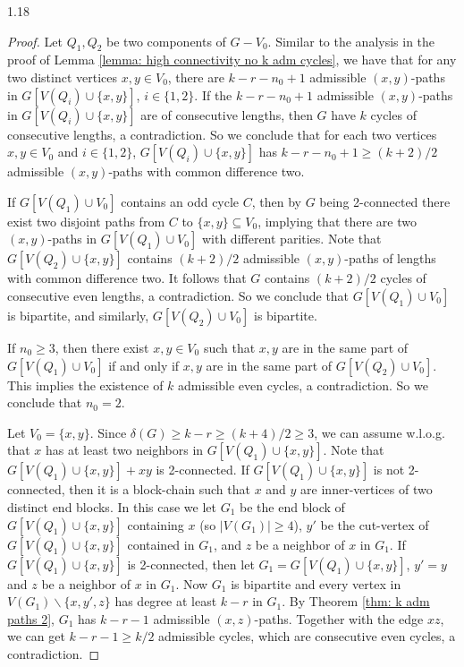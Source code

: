 \documentclass[10pt]{article}
\begin{document}
\begin{spacing}{1.18}
\begin{proof}
    Let $Q_1,Q_2$ be two components of $G-V_0$. Similar to the analysis in the proof of Lemma \ref{lemma: high connectivity no k adm cycles}, we have that for any two distinct vertices $x,y\in V_0$, there are $k-r-n_0+1$ admissible $(x,y)$-paths in $G[V(Q_i)\cup \{x,y\}]$, $i\in \{1,2\}$. If the $k-r-n_0+1$ admissible $(x,y)$-paths in $G[V(Q_i)\cup \{x,y\}]$ are of consecutive lengths, then $G$ have $k$ cycles of consecutive lengths, a contradiction. So we conclude that for each two vertices $x,y\in V_0$ and $i\in\{1,2\}$, $G[V(Q_i)\cup \{x,y\}]$ has $k-r-n_0+1\geqslant (k+2)/2$ admissible $(x,y)$-paths with common difference two. 
    
    If $G[V(Q_1)\cup V_0]$ contains an odd cycle $C$, then by $G$ being 2-connected there exist two disjoint paths from $C$ to $\{x,y\}\subseteq V_0$, implying that there are two $(x,y)$-paths in $G[V(Q_1)\cup V_0]$ with different parities. Note that $G[V(Q_2)\cup \{x,y\}]$ contains $(k+2)/2$ admissible $(x,y)$-paths of lengths with common difference two. It follows that $G$ contains $(k+2)/2$ cycles of consecutive even lengths, a contradiction. So we conclude that $G[V(Q_1)\cup V_0]$ is bipartite, and similarly, $G[V(Q_2)\cup V_0]$ is bipartite. 
    
    If $n_0\geqslant 3$, then there exist $x,y\in V_0$ such that $x,y$ are in the same part of $G[V(Q_1)\cup V_0]$ if and only if $x,y$ are in the same part of $G[V(Q_2)\cup V_0]$. This implies the existence of $k$ admissible even cycles, a contradiction. So we conclude that $n_0=2$. 
    
    Let $V_0=\{x,y\}$. Since $\delta(G)\geqslant k-r\geqslant (k+4)/2\geqslant 3$, we can assume w.l.o.g. that $x$ has at least two neighbors in $G[V(Q_1)\cup\{x,y\}]$. Note that $G[V(Q_1)\cup\{x,y\}]+xy$ is 2-connected. If $G[V(Q_1)\cup\{x,y\}]$ is not 2-connected, then it is a block-chain such that $x$ and $y$ are inner-vertices of two distinct end blocks. In this case we let $G_1$ be the end block of $G[V(Q_1)\cup\{x,y\}]$ containing $x$ (so $|V(G_1)|\geqslant 4$), $y'$ be the cut-vertex of $G[V(Q_1)\cup\{x,y\}]$ contained in $G_1$, and $z$ be a neighbor of $x$ in $G_1$. If $G[V(Q_1)\cup\{x,y\}]$ is 2-connected, then let $G_1=G[V(Q_1)\cup\{x,y\}]$, $y'=y$ and $z$ be a neighbor of $x$ in $G_1$. Now $G_1$ is bipartite and every vertex in $V(G_1)\backslash\{x,y',z\}$ has degree at least $k-r$ in $G_1$. By Theorem \ref{thm: k adm paths 2}, $G_1$ has $k-r-1$ admissible $(x,z)$-paths. Together with the edge $xz$, we can get $k-r-1\geqslant k/2$ admissible cycles, which are consecutive even cycles, a contradiction.
\end{proof}


\end{spacing}
\end{document}
